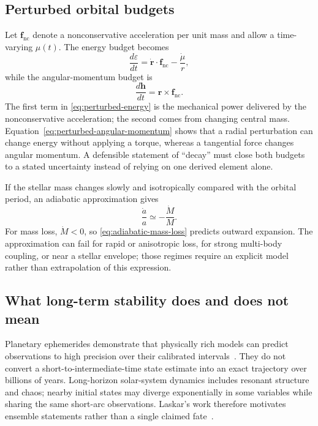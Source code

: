 \documentclass[10pt,conference]{IEEEtran}
\begin{document}
\subsection{Perturbed orbital budgets}

Let $\mathbf{f}_{\mathrm{nc}}$ denote a nonconservative acceleration per unit mass and allow a time-varying $\mu(t)$. The energy budget becomes
\begin{equation}
\frac{d\varepsilon}{dt}=\dot{\mathbf{r}}\cdot\mathbf{f}_{\mathrm{nc}}-\frac{\dot{\mu}}{r},
\label{eq:perturbed-energy}
\end{equation}
while the angular-momentum budget is
\begin{equation}
\frac{d\mathbf{h}}{dt}=\mathbf{r}\times\mathbf{f}_{\mathrm{nc}}.
\label{eq:perturbed-angular-momentum}
\end{equation}
The first term in \eqref{eq:perturbed-energy} is the mechanical power delivered by the nonconservative acceleration; the second comes from changing central mass. Equation~\eqref{eq:perturbed-angular-momentum} shows that a radial perturbation can change energy without applying a torque, whereas a tangential force changes angular momentum. A defensible statement of ``decay'' must close both budgets to a stated uncertainty instead of relying on one derived element alone.

If the stellar mass changes slowly and isotropically compared with the orbital period, an adiabatic approximation gives
\begin{equation}
\frac{\dot{a}}{a}\simeq-\frac{\dot{M}}{M}.
\label{eq:adiabatic-mass-loss}
\end{equation}
For mass loss, $\dot{M}<0$, so \eqref{eq:adiabatic-mass-loss} predicts outward expansion. The approximation can fail for rapid or anisotropic loss, for strong multi-body coupling, or near a stellar envelope; those regimes require an explicit model rather than extrapolation of this expression.

\subsection{What long-term stability does and does not mean}

Planetary ephemerides demonstrate that physically rich models can predict observations to high precision over their calibrated intervals~\cite{park2021}. They do not convert a short-to-intermediate-time state estimate into an exact trajectory over billions of years. Long-horizon solar-system dynamics includes resonant structure and chaos; nearby initial states may diverge exponentially in some variables while sharing the same short-arc observations. Laskar's work therefore motivates ensemble statements rather than a single claimed fate~\cite{laskar1994,laskargastineau2009}.
\end{document}
